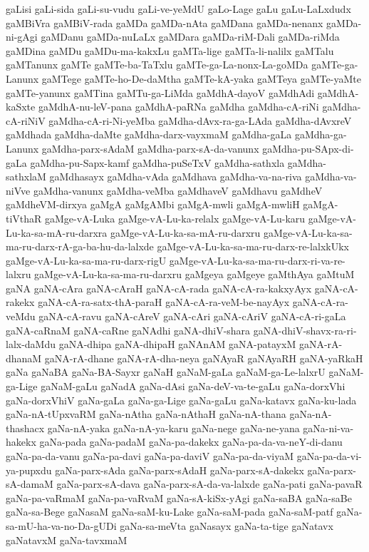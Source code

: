 {gaLisi
gaLi-sida
gaLi-su-vudu
gaLi-ve-yeMdU
gaLo-Lage
gaLu
gaLu-LaLxdudx
gaMBiVra
gaMBiV-rada
gaMDa
gaMDa-nAta
gaMDana
gaMDa-nenanx
gaMDa-ni-gAgi
gaMDanu
gaMDa-nuLaLx
gaMDara
gaMDa-riM-Dali
gaMDa-riMda
gaMDina
gaMDu
gaMDu-ma-kakxLu
gaMTa-lige
gaMTa-li-nalilx
gaMTalu
gaMTanunx
gaMTe
gaMTe-ba-TaTxlu
gaMTe-ga-La-nonx-La-goMDa
gaMTe-ga-Lanunx
gaMTege
gaMTe-ho-De-daMtha
gaMTe-kA-yaka
gaMTeya
gaMTe-yaMte
gaMTe-yanunx
gaMTina
gaMTu-ga-LiMda
gaMdhA-dayoV
gaMdhAdi
gaMdhA-kaSxte
gaMdhA-nu-leV-pana
gaMdhA-paRNa
gaMdha
gaMdha-cA-riNi
gaMdha-cA-riNiV
gaMdha-cA-ri-Ni-yeMba
gaMdha-dAvx-ra-ga-LAda
gaMdha-dAvxreV
gaMdhada
gaMdha-daMte
gaMdha-darx-vayxmaM
gaMdha-gaLa
gaMdha-ga-Lanunx
gaMdha-parx-sAdaM
gaMdha-parx-sA-da-vanunx
gaMdha-pu-SApx-di-gaLa
gaMdha-pu-Sapx-kamf
gaMdha-puSeTxV
gaMdha-sathxla
gaMdha-sathxlaM
gaMdhasayx
gaMdha-vAda
gaMdhava
gaMdha-va-na-riva
gaMdha-va-niVve
gaMdha-vanunx
gaMdha-veMba
gaMdhaveV
gaMdhavu
gaMdheV
gaMdheVM-dirxya
gaMgA
gaMgAMbi
gaMgA-mwli
gaMgA-mwliH
gaMgA-tiVthaR
gaMge-vA-Luka
gaMge-vA-Lu-ka-relalx
gaMge-vA-Lu-karu
gaMge-vA-Lu-ka-sa-mA-ru-darxra
gaMge-vA-Lu-ka-sa-mA-ru-darxru
gaMge-vA-Lu-ka-sa-ma-ru-darx-rA-ga-ba-hu-da-lalxde
gaMge-vA-Lu-ka-sa-ma-ru-darx-re-lalxkUkx
gaMge-vA-Lu-ka-sa-ma-ru-darx-rigU
gaMge-vA-Lu-ka-sa-ma-ru-darx-ri-va-re-lalxru
gaMge-vA-Lu-ka-sa-ma-ru-darxru
gaMgeya
gaMgeye
gaMthAya
gaMtuM
gaNA
gaNA-cAra
gaNA-cAraH
gaNA-cA-rada
gaNA-cA-ra-kakxyAyx
gaNA-cA-rakekx
gaNA-cA-ra-satx-thA-paraH
gaNA-cA-ra-veM-be-nayAyx
gaNA-cA-ra-veMdu
gaNA-cA-ravu
gaNA-cAreV
gaNA-cAri
gaNA-cAriV
gaNA-cA-ri-gaLa
gaNA-caRnaM
gaNA-caRne
gaNAdhi
gaNA-dhiV-shara
gaNA-dhiV-shavx-ra-ri-lalx-daMdu
gaNA-dhipa
gaNA-dhipaH
gaNAnAM
gaNA-patayxM
gaNA-rA-dhanaM
gaNA-rA-dhane
gaNA-rA-dha-neya
gaNAyaR
gaNAyaRH
gaNA-yaRkaH
gaNa
gaNaBA
gaNa-BA-Sayxr
gaNaH
gaNaM-gaLa
gaNaM-ga-Le-lalxrU
gaNaM-ga-Lige
gaNaM-gaLu
gaNadA
gaNa-dAsi
gaNa-deV-va-te-gaLu
gaNa-dorxVhi
gaNa-dorxVhiV
gaNa-gaLa
gaNa-ga-Lige
gaNa-gaLu
gaNa-katavx
gaNa-ku-lada
gaNa-nA-tUpxvaRM
gaNa-nAtha
gaNa-nAthaH
gaNa-nA-thana
gaNa-nA-thashacx
gaNa-nA-yaka
gaNa-nA-ya-karu
gaNa-nege
gaNa-ne-yana
gaNa-ni-va-hakekx
gaNa-pada
gaNa-padaM
gaNa-pa-dakekx
gaNa-pa-da-va-neY-di-danu
gaNa-pa-da-vanu
gaNa-pa-davi
gaNa-pa-daviV
gaNa-pa-da-viyaM
gaNa-pa-da-vi-ya-pupxdu
gaNa-parx-sAda
gaNa-parx-sAdaH
gaNa-parx-sA-dakekx
gaNa-parx-sA-damaM
gaNa-parx-sA-dava
gaNa-parx-sA-da-va-lalxde
gaNa-pati
gaNa-pavaR
gaNa-pa-vaRmaM
gaNa-pa-vaRvaM
gaNa-sA-kiSx-yAgi
gaNa-saBA
gaNa-saBe
gaNa-sa-Bege
gaNasaM
gaNa-saM-ku-Lake
gaNa-saM-pada
gaNa-saM-patf
gaNa-sa-mU-ha-va-no-Da-gUDi
gaNa-sa-meVta
gaNasayx
gaNa-ta-tige
gaNatavx
gaNatavxM
gaNa-tavxmaM
}
